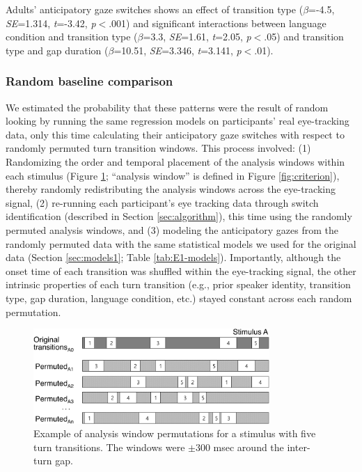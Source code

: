 \documentclass[authoryear, 12pt]{elsarticle}
\begin{document}
Adults' anticipatory gaze switches shows an effect of transition type (\textit{$\beta$}=-4.5, \textit{SE}=1.314, \textit{t}=-3.42, \textit{p}$<$.001) and significant interactions between language condition and transition type (\textit{$\beta$}=3.3, \textit{SE}=1.61, \textit{t}=2.05, \textit{p}$<$.05) and transition type and gap duration (\textit{$\beta$}=10.51, \textit{SE}=3.346, \textit{t}=3.141, \textit{p}$<$.01).

\subsubsection{Random baseline comparison}
\label{sec:randbaseline1}

We estimated the probability that these patterns were the result of random looking by running the same regression models on participants' real eye-tracking data, only this time calculating their anticipatory gaze switches with respect to randomly permuted turn transition windows. This process involved: (1) Randomizing the order and temporal placement of the analysis windows within each stimulus (Figure \ref{fig:shuffling}; ``analysis window'' is defined in Figure \ref{fig:criterion}), thereby randomly redistributing the analysis windows across the eye-tracking signal, (2) re-running each participant's eye tracking data through switch identification (described in Section \ref{sec:algorithm}), this time using the randomly permuted analysis windows, and (3) modeling the anticipatory gazes from the randomly permuted data with the same statistical models we used for the original data (Section \ref{sec:models1}; Table \ref{tab:E1-models}). Importantly, although the onset time of each transition was shuffled within the eye-tracking signal, the other intrinsic properties of each turn transition (e.g., prior speaker identity, transition type, gap duration, language condition, etc.) stayed constant across each random permutation. 

\begin{figure}[ht!]
\begin{center}
\includegraphics[width=0.8\textwidth]{figures/FIG-ShuffledWindows.png}
\end{center}
\caption{Example of analysis window permutations for a stimulus with five turn transitions. The windows were $\pm$300 msec around the inter-turn gap.} 
\label{fig:shuffling}
\end{figure}
\end{document}
